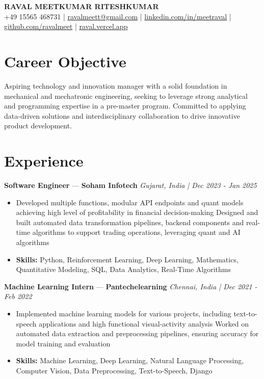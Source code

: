 \documentclass[a4paper,10pt]{article}
\begin{document}
\begin{center}
  {\Large\bfseries RAVAL MEETKUMAR RITESHKUMAR}\\[2pt]
  {\small +49 15565 468731 \;|\; \href{mailto:ravalmeett@gmail.com}{ravalmeett@gmail.com} \;|\; \href{https://www.linkedin.com/in/meetraval/}{linkedin.com/in/meetraval} \;|\; \href{https://github.com/ravalmeet}{github.com/ravalmeet} \;|\; \href{https://raval.vercel.app/}{raval.vercel.app}}
\end{center}
\vspace{-3pt}

\section*{Career Objective}
Aspiring technology and innovation manager with a solid foundation in mechanical and mechatronic engineering, seeking to leverage strong analytical and programming expertise in a pre-master program. Committed to applying data-driven solutions and interdisciplinary collaboration to drive innovative product development.\par

\section*{Experience}
\textbf{Software Engineer} — \textbf{Soham Infotech} \hfill \textit{Gujarat, India \;|\; Dec 2023 - Jan 2025}\par
\vspace{1pt}
\begin{itemize}
  \item Developed multiple functions, modular API endpoints and quant models achieving high level of profitability in financial decision-making Designed and built automated data transformation pipelines, backend components and real-time algorithms to support trading operations, leveraging quant and AI algorithms
  \item \textbf{Skills:} Python, Reinforcement Learning, Deep Learning, Mathematics, Quantitative Modeling, SQL, Data Analytics, Real-Time Algorithms
\end{itemize}
\vspace{3pt}
\textbf{Machine Learning Intern} — \textbf{Pantechelearning} \hfill \textit{Chennai, India \;|\; Dec 2021 - Feb 2022}\par
\vspace{1pt}
\begin{itemize}
  \item Implemented machine learning models for various projects, including text-to-speech applications and high functional visual-activity analysis Worked on automated data extraction and preprocessing pipelines, ensuring accuracy for model training and evaluation
  \item \textbf{Skills:} Machine Learning, Deep Learning, Natural Language Processing, Computer Vision, Data Preprocessing, Text-to-Speech, Django
\end{itemize}
\end{document}
